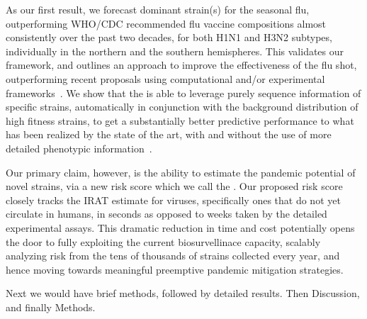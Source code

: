 \documentclass[onecolumn, compsoc,10pt]{IEEEtran}
\begin{document}

As our first result, we forecast dominant strain(s) for the seasonal flu, outperforming  WHO/CDC recommended flu vaccine compositions almost consistently over the past two decades, for both H1N1 and H3N2 subtypes, individually in the northern and the southern hemispheres. This  validates our framework, and  outlines an approach to improve the effectiveness of the flu shot, outperforming  recent proposals using computational and/or experimental frameworks~\cite{huddleston2020integrating,neher2014predicting}.
We show that the \enet is able to leverage purely sequence information of specific strains, automatically in conjunction with the background distribution of high fitness strains, to  get a substantially  better predictive performance to what has been realized by the state of the art, with and without the use of more detailed phenotypic information~\cite{huddleston2020integrating,neher2014predicting}.


Our primary claim, however,  is the ability to estimate the pandemic potential of novel strains, via a new risk score which we call the  \erisk.  Our proposed risk score closely tracks  the IRAT estimate for  \infl  viruses, specifically ones that do not yet circulate in humans, in seconds as opposed to weeks taken by the detailed experimental assays. This dramatic reduction in time and cost potentially opens the door to fully exploiting the  current biosurvellinace capacity, scalably analyzing risk from  the tens of thousands of strains collected every year, and hence moving towards   meaningful preemptive pandemic mitigation strategies.


\clearpage 

{\color{Green1}

  Next we would have brief methods, followed by detailed results.
  Then Discussion, and finally Methods.}
\end{document}
